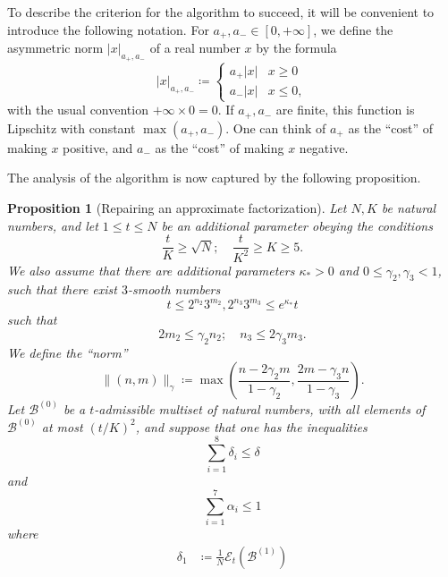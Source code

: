 \documentclass[12pt,a4paper,reqno]{amsart}
\numberwithin{equation}{section}
\theoremstyle{plain}
\newtheorem{proposition}[theorem]{Proposition}
\theoremstyle{definition}
\newcommand\tuple{{\mathcal B}}
\newcommand\excess{{\mathcal{E}}}
\begin{document}
To describe the criterion for the algorithm to succeed, it will be convenient to introduce the following notation.
For $a_+,a_- \in [0,+\infty]$, we define the asymmetric norm $|x|_{a_+,a_-}$ of a real number $x$ by the formula
$$ 
|x|_{a_+,a_-} \coloneqq  \begin{cases} 
  a_+ |x| & x\geq 0 \\
  a_- |x| & x\leq 0,
\end{cases}
$$
with the usual convention $+\infty \times 0 = 0$.
If $a_+,a_-$ are finite, this function is Lipschitz with constant $\max(a_+,a_-)$.  One can think of $a_+$ as the ``cost'' of making $x$ positive, and $a_-$ as the
``cost'' of making $x$ negative. 

The analysis of the algorithm is now captured by the following proposition.

\begin{proposition}[Repairing an approximate factorization]\label{repair}  Let $N, K$ be natural numbers, and let $1 \leq t \leq N$ be an additional parameter obeying the conditions
\begin{equation}\label{conditions}
    \frac{t}{K} \geq \sqrt{N}; \quad \frac{t}{K^2} \geq K \geq 5.
\end{equation}
We also assume that there are additional parameters $\kappa_* > 0$ and $0 \leq \gamma_2, \gamma_3 < 1$, such that there exist $3$-smooth numbers
\begin{equation}\label{tlip} 
  t \leq 2^{n_2} 3^{m_2}, 2^{n_3} 3^{m_3} \leq e^{\kappa_*} t
\end{equation}
such that
\begin{equation}\label{nm}
  2m_2 \leq \gamma_2 n_2; \quad n_3 \leq 2\gamma_3 m_3.
\end{equation}
We define the ``norm''
$$ \| (n,m) \|_\gamma \coloneqq \max\left( \frac{n-2\gamma_2 m}{1-\gamma_2}, \frac{2m-\gamma_3 n}{1-\gamma_3} \right).$$
Let $\tuple^{(0)}$ be a $t$-admissible multiset of natural numbers, with all elements of $\tuple^{(0)}$ at most $(t/K)^2$, and suppose that one has the inequalities
\begin{equation}\label{delta-cond}
\sum_{i=1}^8 \delta_i \leq \delta
\end{equation}
and
\begin{equation}\label{alpha-cond}
  \sum_{i=1}^7 \alpha_i \leq 1
\end{equation} 
where
\begin{align}
\delta_1 &\coloneqq \frac{1}{N} \excess_t(\tuple^{(1)}) \label{delta1-def}  \\

\end{align}
\end{proposition}
\end{document}
